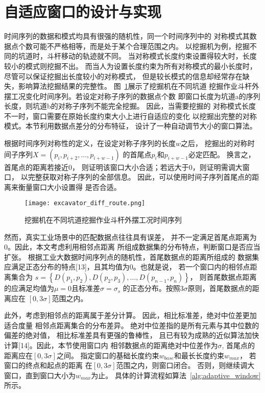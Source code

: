 \section{自适应窗口的设计与实现}
时间序列的数据和模式均具有很强的随机性，同一个时间序列中的
对称模式其数据点个数可能不严格相等，而是处于某个合理范围之内。
以挖掘机为例，挖掘不同的坑道时，斗杆移动的轨迹就不同。
当对称模式长度约束设置得较大时，长度较小的模式则挖掘不出。
而当人为设置长度约束为所有对称模式的最小长度时，
尽管可以保证挖掘出长度较小的对称模式，
但是较长模式的信息却经常存在缺失，影响算法挖掘结果的完整性。
图~\ref{fig:excavator_diff_route}展示了挖掘机在不同坑道
挖掘作业斗杆外摆工况变化时间序列。若设定对称子序列的数据点个数
即窗口长度为坑道a的序列长度，则坑道b的对称子序列不能完全挖掘。
因此，当需要挖掘的
对称模式长度不一时，窗口需要在原始长度约束大小上进行自适应的变化
以挖掘出完整的对称模式。本节利用数据点差分的分布特征，
设计了一种自动调节大小的窗口算法。

根据时间序列对称性的定义，在设定对称子序列的长度$w$之后，
挖掘出的对称时间子序列$X=\left(p_{i},p_{i+2},…,p_{i+w-1} \right)$
的首尾点$p_{i}$和$p_{i+w-1}$必定匹配。
换言之，首尾点的距离若接近0，
则证明该窗口大小合适；若远大于0，则证明需调大窗口，
以完整获取对称子序列的全部信息。
因此，可以使用时间子序列首尾点的距离来衡量窗口大小设置得
是否合适。
\begin{figure}
  \centering
  \texttt{[image: excavator\_diff\_route.png]}
  \caption{挖掘机在不同坑道挖掘作业斗杆外摆工况时间序列}
  \label{fig:excavator_diff_route}
\end{figure}

然而，真实工业场景中的匹配数据点往往具有误差，
并不一定满足首尾点距离为0。因此，本文考虑利用相邻点距离
所组成数据集的分布特点，判断窗口是否应当扩张。
根据工业大数据时间序列点的随机性，首尾数据点的距离所组成的
数据集应满足正态分布的特点[13]，且其均值为0。也就是说，
若一个窗口内的相邻点距离集合为
$s=\left\{D\left(p_{1}, p_{2}\right), D\left(p_{2}, p_{3}\right), \ldots, D\left(p_{n-1}, p_{n}\right)\right\}$，
则首尾数据点距离的应满足均值为$\mu=0$且标准差$\sigma=\sigma_s$
的正态分布。按照3$\sigma$原则，首尾数据点的距离应在
$\left[0,3\sigma\right]$范围之内。

此外，考虑到相邻点的距离属于差分计算。
因此，相比标准差，绝对中位差更加适合度量
相邻点距离集合的分布差异。
绝对中位差指的是所有元素与其中位数的偏差的绝对值，
相比标准差具有更强的鲁棒性，
且已有较为成熟的近似算法加快计算[14]。因此，本节使用窗口内
相邻数据点的距离绝对中位差作为$\sigma$,
首尾点的距离应在$\left[0,3\sigma\right]$之间。
指定窗口的基础长度约束$w_{base}$和最长长度约束$w_{max}$，
若窗口的终点和起点的距离
在$\left[0,3\sigma\right]$范围之内，则窗口闭合。
否则，则继续调大窗口，直到窗口大小为$w_{max}$为止。
具体的计算流程如算法~\ref{alg:adaptive_window}所示。

